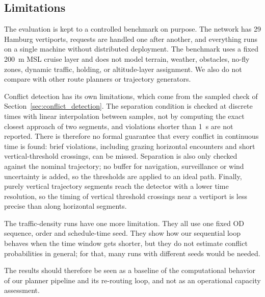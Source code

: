 \subsection{Limitations}
\label{sec:limitations}

The evaluation is kept to a controlled benchmark on purpose. The network has 29 Hamburg vertiports, requests are handled one after another, and everything runs on a single machine without distributed deployment. The benchmark uses a fixed \SI{200}{m} MSL cruise layer and does not model terrain, weather, obstacles, no-fly zones, dynamic traffic, holding, or altitude-layer assignment. We also do not compare with other route planners or trajectory generators.

Conflict detection has its own limitations, which come from the sampled check of Section~\ref{sec:conflict_detection}. The separation condition is checked at discrete times with linear interpolation between samples, not by computing the exact closest approach of two segments, and violations shorter than \SI{1}{s} are not reported. There is therefore no formal guarantee that every conflict in continuous time is found: brief violations, including grazing horizontal encounters and short vertical-threshold crossings, can be missed. Separation is also only checked against the nominal trajectory; no buffer for navigation, surveillance or wind uncertainty is added, so the thresholds are applied to an ideal path. Finally, purely vertical trajectory segments reach the detector with a lower time resolution, so the timing of vertical threshold crossings near a vertiport is less precise than along horizontal segments.

The traffic-density runs have one more limitation. They all use one fixed OD sequence, order and schedule-time seed. They show how our sequential loop behaves when the time window gets shorter, but they do not estimate conflict probabilities in general; for that, many runs with different seeds would be needed.

The results should therefore be seen as a baseline of the computational behavior of our planner pipeline and its re-routing loop, and not as an operational capacity assessment.
